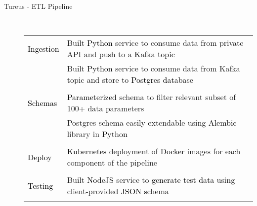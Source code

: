 \documentclass[12pt]{article}
\begin{document}
\begin{description}
\begin{description}
                \item[Tureus - ETL Pipeline] \hfill\\
                \textcolor{gray}{
                    \begin{tabular}{l|l}
                        \\[-1.0mm]
                        \textcolor{black}{Ingestion}
                            & Built \textcolor{black}{Python} service to consume data from private API and push to a \textcolor{black}{Kafka topic}\\
                            & Built \textcolor{black}{Python} service to consume data from Kafka topic and store to \textcolor{black}{Postgres database}\\
                        \\[-1.7mm]
                        \textcolor{black}{Schemas}
                            & \textcolor{black}{Parameterized} schema to filter relevant subset of 100+ data parameters\\
                            & Postgres schema easily extendable using \textcolor{black}{Alembic} library in \textcolor{black}{Python}\\
                        \\[-1.7mm]
                        \textcolor{black}{Deploy}
                            & \textcolor{black}{Kubernetes} deployment of \textcolor{black}{Docker} images for each component of the pipeline\\
                        \\[-1.7mm]
                        \textcolor{black}{Testing}
                            & Built \textcolor{black}{NodeJS} service to \textcolor{black}{generate test data} using client-provided \textcolor{black}{JSON schema}\\
                        \\[-1.0mm]
                    \end{tabular}
                }

                \vspace{100mm}


\end{description}
\end{description}
\end{document}
